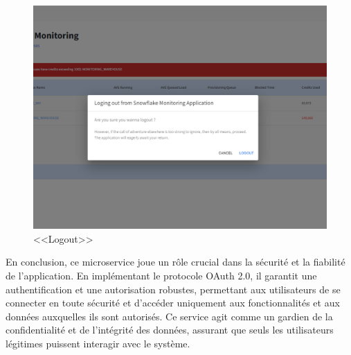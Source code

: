 \begin{itemize}
\begin{figure}[H]
                    \includegraphics[width =0.8\linewidth]{img/captures/auth/logout.png}
                    \caption{ <<Logout>>}
                        \label{fig:logout}
                    \end{figure}
            \end{itemize}
\par En conclusion, ce microservice joue un rôle crucial dans la sécurité et la fiabilité de l'application. En implémentant le protocole OAuth 2.0, il garantit une authentification et une autorisation robustes, permettant aux utilisateurs de se connecter en toute sécurité et d'accéder uniquement aux fonctionnalités et aux données auxquelles ils sont autorisés. Ce service agit comme un gardien de la confidentialité et de l'intégrité des données, assurant que seuls les utilisateurs légitimes puissent interagir avec le système. 
